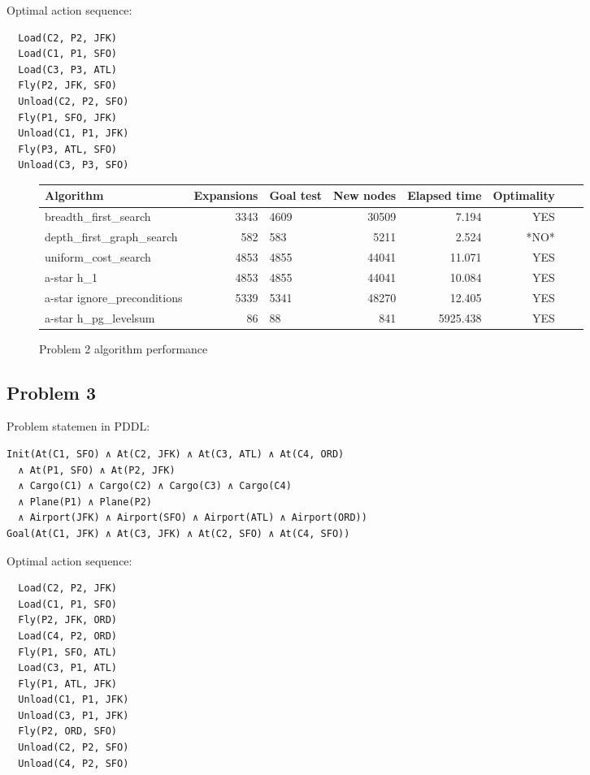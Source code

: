 \documentclass[12pt, a4paper]{article}
\begin{document}
Optimal action sequence:

\begin{verbatim}
  Load(C2, P2, JFK)
  Load(C1, P1, SFO)
  Load(C3, P3, ATL)
  Fly(P2, JFK, SFO)
  Unload(C2, P2, SFO)
  Fly(P1, SFO, JFK)
  Unload(C1, P1, JFK)
  Fly(P3, ATL, SFO)
  Unload(C3, P3, SFO)
\end{verbatim}

\begin{figure}[htbp]
\begin{tabular}{lrlrrrrl}
\toprule
{} Algorithm &  Expansions &  Goal test &  New nodes &  Elapsed time & Optimality \\
\midrule
breadth\_first\_search &        3343 &       4609 &      30509 &      7.194 &        YES \\
depth\_first\_graph\_search &         582 &        583 &       5211 &      2.524 &         *NO* \\
uniform\_cost\_search & 4853	& 4855	& 44041	& 11.071 &	YES \\
a-star h\_1 &        4853 &       4855 &      44041 &     10.084 &        YES \\
a-star ignore\_preconditions &        5339 &       5341 &      48270 &     12.405 &        YES \\
a-star h\_pg\_levelsum &          86 &         88 &        841 &   5925.438 &        YES \\
\bottomrule
\end{tabular}
\caption{Problem 2 algorithm performance}
\end{figure}

\subsection{Problem 3}

Problem statemen in PDDL:

\begin{verbatim}
Init(At(C1, SFO) ∧ At(C2, JFK) ∧ At(C3, ATL) ∧ At(C4, ORD)
  ∧ At(P1, SFO) ∧ At(P2, JFK)
  ∧ Cargo(C1) ∧ Cargo(C2) ∧ Cargo(C3) ∧ Cargo(C4)
  ∧ Plane(P1) ∧ Plane(P2)
  ∧ Airport(JFK) ∧ Airport(SFO) ∧ Airport(ATL) ∧ Airport(ORD))
Goal(At(C1, JFK) ∧ At(C3, JFK) ∧ At(C2, SFO) ∧ At(C4, SFO))
\end{verbatim}

Optimal action sequence:

\begin{verbatim}
  Load(C2, P2, JFK)
  Load(C1, P1, SFO)
  Fly(P2, JFK, ORD)
  Load(C4, P2, ORD)
  Fly(P1, SFO, ATL)
  Load(C3, P1, ATL)
  Fly(P1, ATL, JFK)
  Unload(C1, P1, JFK)
  Unload(C3, P1, JFK)
  Fly(P2, ORD, SFO)
  Unload(C2, P2, SFO)
  Unload(C4, P2, SFO)
\end{verbatim}
\end{document}
